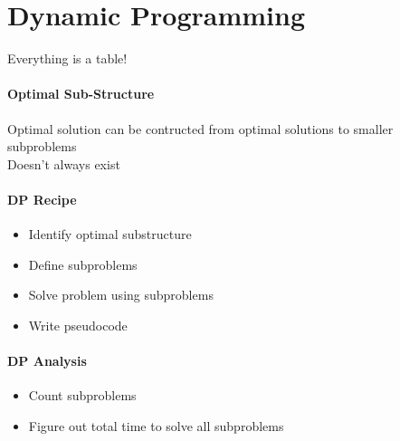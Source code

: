 \section{Dynamic Programming}
Everything is a table!
\paragraph{Optimal Sub-Structure}
Optimal solution can be contructed from optimal solutions to smaller subproblems\\
\textcolor{Bittersweet}{Doesn't always exist}
\paragraph{DP Recipe}
\begin{itemize}
  \item Identify optimal substructure
  \item Define subproblems
  \item Solve problem using subproblems
  \item Write pseudocode
\end{itemize}
\paragraph{DP Analysis}
\begin{itemize}
  \item Count subproblems
  \item Figure out total time to solve all subproblems
\end{itemize}
